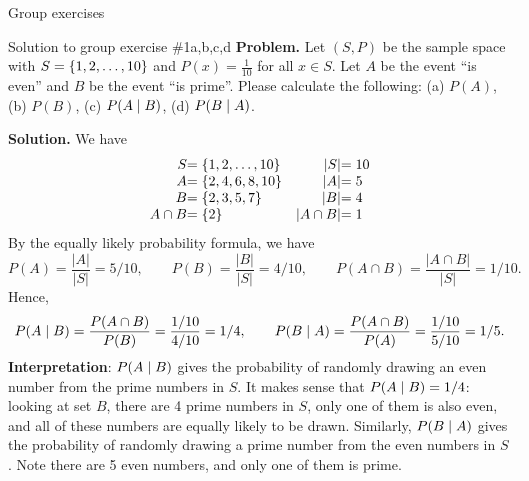 \documentclass[10pt]{beamer}
\begin{document}
\begin{frame}{Group exercises}
\end{frame}



\begin{frame}{Solution to group exercise \#1a,b,c,d}
\footnotesize 
\textbf{Problem.}  Let $(S,P)$ be the sample space with $S=\{ {1,2,\hdots, 10} \}$ and $P(x) =\frac{1}{10}$ for all $x \in S$.  Let $A$ be the event \enquote{is even} and $B$ be the event \enquote{is prime}.  Please calculate the following: (a) $P(A)$,  (b) $P(B)$, (c) $P(A \; | \; B)$, (d) $P(B \; | \; A)$.

\vfill 

\textbf{Solution.}
We have 
\[
\begin{array}{r@{}l r@{}l}
S &= \set{1,2,\hdots, 10} & |S| &= 10 \\
A &= \set{2,4,6,8,10} & |A| &= 5 \\
B &= \set{2,3,5,7} & |B| &= 4 \\
A \cap B &= \set{2} & |A \cap B| &= 1
\end{array}
\]
%
By the equally likely probability formula, we have
 \[ P(A) = \frac{|A|}{|S|} = 5/10, \qquad P(B) = \frac{|B|}{|S|} = 4/10, \qquad P(A \cap B) =  \frac{|A \cap B|}{|S|} = 1/10. \]
Hence,
\[P(A \; | \; B) = \frac{P(A \cap B)}{P(B)} = \frac{1/10}{4/10} = 1/4, \qquad  P(B \; | \; A) = \frac{P(A \cap B)}{P(A)} = \frac{1/10}{5/10} = 1/5.\]
%
\vfill 
\textbf{Interpretation}: $P(A \; | \; B)$ gives the probability of randomly drawing an even number from the prime numbers in $S$.  It makes sense that $P(A \; | \; B)=1/4$: looking at set $B$, there are 4 prime numbers in $S$, only one of them is also even, and all of these numbers are equally likely to be drawn.  Similarly, $P(B \; | \; A)$ gives the probability of randomly drawing a prime number from the even numbers in $S$.  Note there are 5 even numbers, and only one of them is prime.
\end{frame}
\end{document}
